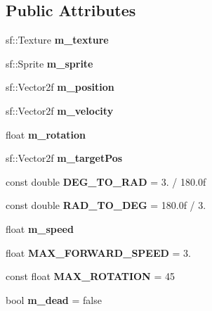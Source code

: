 \subsection*{Public Attributes}
\begin{DoxyCompactItemize}
\item 
\mbox{\label{class_missile_a9219f26e1a3b7344459dd1551295329f}} 
sf\+::\+Texture {\bfseries m\+\_\+texture}
\item 
\mbox{\label{class_missile_ac006e17dd989f5a3659c72060883dd3d}} 
sf\+::\+Sprite {\bfseries m\+\_\+sprite}
\item 
\mbox{\label{class_missile_aee138dea114b6d8f0aec3bb95ea71f50}} 
sf\+::\+Vector2f {\bfseries m\+\_\+position}
\item 
\mbox{\label{class_missile_aa36d8d7569ae95104fed5ed1a0b90440}} 
sf\+::\+Vector2f {\bfseries m\+\_\+velocity}
\item 
\mbox{\label{class_missile_a4159c2ca8c15633f2b4e64a52149a192}} 
float {\bfseries m\+\_\+rotation}
\item 
\mbox{\label{class_missile_ab4cd3fbf7278f592f43f0be12a000878}} 
sf\+::\+Vector2f {\bfseries m\+\_\+target\+Pos}
\item 
\mbox{\label{class_missile_ab4a3a052711b466e4152dfc2fa7c2bcc}} 
const double {\bfseries D\+E\+G\+\_\+\+T\+O\+\_\+\+R\+AD} = 3. / 180.\+0f
\item 
\mbox{\label{class_missile_aeb24f712eff93ede635b324c83cc9da3}} 
const double {\bfseries R\+A\+D\+\_\+\+T\+O\+\_\+\+D\+EG} = 180.\+0f / 3.
\item 
\mbox{\label{class_missile_ae3d54aa52663b42c2e0eb3360b62c8dd}} 
float {\bfseries m\+\_\+speed}
\item 
\mbox{\label{class_missile_a8b6e21f47fd3a727a0beb4933347397a}} 
float {\bfseries M\+A\+X\+\_\+\+F\+O\+R\+W\+A\+R\+D\+\_\+\+S\+P\+E\+ED} = 3.
\item 
\mbox{\label{class_missile_abd03c51cfb5d584c2634e8f56851b574}} 
const float {\bfseries M\+A\+X\+\_\+\+R\+O\+T\+A\+T\+I\+ON} = 45
\item 
\mbox{\label{class_missile_a317ab9a61aab790021ecf5278706db58}} 
bool {\bfseries m\+\_\+dead} = false
\end{DoxyCompactItemize}
